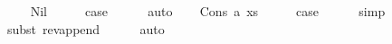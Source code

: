\begin{isabellebody}
\ \ \isamarkupfalse%
\ Nil\isanewline
\ \ \isamarkupfalse%
\ \isamarkupfalse%
\ {\isacharquery}{\kern0pt}case\isanewline
\ \ \ \ \isamarkupfalse%
\ auto\isanewline
{}\isamarkupfalse%
\isanewline
\ \ \isamarkupfalse%
\ {\isacharparenleft}{\kern0pt}Cons\ a\ xs{\isacharparenright}{\kern0pt}\isanewline
\ \ \isamarkupfalse%
\ \isamarkupfalse%
\ {\isacharquery}{\kern0pt}case\isanewline
\ \ \ \ \isamarkupfalse%
\ simp\isanewline
\ \ \ \ \isamarkupfalse%
{\isacharparenleft}{\kern0pt}subst\ rev{\isacharprime}{\kern0pt}{\isacharunderscore}{\kern0pt}append{\isacharparenright}{\kern0pt}\isanewline
\ \ \ \ \isamarkupfalse%
\ auto\isanewline
{}\isamarkupfalse%
%
\endisatagproof
{\isafoldproof}%
%
\isadelimproof
\isanewline
%
\endisadelimproof
\isanewline
\isanewline
%
\isadelimtheory
\isanewline
%
\endisadelimtheory
%
\isatagtheory
{}\isamarkupfalse%
%
\endisatagtheory
{\isafoldtheory}%
%
\isadelimtheory
%
\endisadelimtheory
%
\end{isabellebody}%
\endinput
